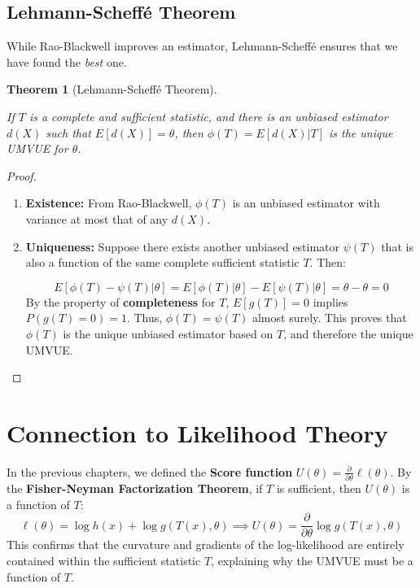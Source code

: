 \documentclass[
  letterpaper,
  DIV=11,
  numbers=noendperiod]{scrreprt}
\renewcommand{\[}{\begin{equation}}
\renewcommand{\]}{\end{equation}}
\theoremstyle{definition}
\theoremstyle{plain}
\theoremstyle{plain}
\theoremstyle{plain}
\newtheorem{theorem}{Theorem}[chapter]
\theoremstyle{definition}
\theoremstyle{plain}
\theoremstyle{remark}
\begin{document}
\subsection{Lehmann-Scheffé Theorem}\label{lehmann-scheffuxe9-theorem}

While Rao-Blackwell improves an estimator, Lehmann-Scheffé ensures that
we have found the \emph{best} one.

\begin{theorem}[Lehmann-Scheffé
Theorem]\protect\hypertarget{thm-lehmann-scheffe}{}\label{thm-lehmann-scheffe}

If \(T\) is a complete and sufficient statistic, and there is an
unbiased estimator \(d(X)\) such that \(E[d(X)] = \theta\), then
\(\phi(T) = E[d(X)|T]\) is the unique UMVUE for \(\theta\).

\end{theorem}

\begin{proof}
\leavevmode

\begin{enumerate}
\def\labelenumi{\arabic{enumi}.}
\item
  \textbf{Existence:} From Rao-Blackwell, \(\phi(T)\) is an unbiased
  estimator with variance at most that of any \(d(X)\).
\item
  \textbf{Uniqueness:} Suppose there exists another unbiased estimator
  \(\psi(T)\) that is also a function of the same complete sufficient
  statistic \(T\). Then:

  \[E[\phi(T) - \psi(T) | \theta] = E[\phi(T)|\theta] - E[\psi(T)|\theta] = \theta - \theta = 0\]
  By the property of \textbf{completeness} for \(T\), \(E[g(T)] = 0\)
  implies \(P(g(T)=0) = 1\). Thus, \(\phi(T) = \psi(T)\) almost surely.
  This proves that \(\phi(T)\) is the unique unbiased estimator based on
  \(T\), and therefore the unique UMVUE.
\end{enumerate}

\end{proof}

\section{Connection to Likelihood
Theory}\label{connection-to-likelihood-theory}

In the previous chapters, we defined the \textbf{Score function}
\(U(\theta) = \frac{\partial}{\partial \theta} \ell(\theta)\). By the
\textbf{Fisher-Neyman Factorization Theorem}, if \(T\) is sufficient,
then \(U(\theta)\) is a function of \(T\):
\[\ell(\theta) = \log h(x) + \log g(T(x), \theta) \implies U(\theta) = \frac{\partial}{\partial \theta} \log g(T(x), \theta)\]
This confirms that the curvature and gradients of the log-likelihood are
entirely contained within the sufficient statistic \(T\), explaining why
the UMVUE must be a function of \(T\).
\end{document}
